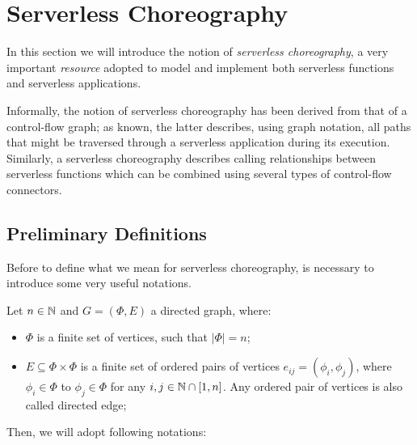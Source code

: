 \newpage
\section{Serverless Choreography}

In this section we will introduce the notion of \textit{serverless choreography}, a very important \textit{resource} adopted to model and implement both serverless functions and serverless applications.

Informally, the notion of serverless choreography has been derived from that of a control-flow graph; as known, the latter describes, using graph notation, all paths that might be traversed through a serverless application during its execution. Similarly, a serverless choreography describes calling relationships between serverless functions which can be combined using several types of control-flow connectors.

\subsection{Preliminary Definitions}

Before to define what we mean for serverless choreography, is necessary to introduce some very useful notations.

Let $n \in \mathbb{N}$ and $G = (\Phi,E)$ a directed graph, where:

\begin{itemize}
	\item $\Phi$ is a finite set of vertices, such that $|\Phi| = n$;
	\item  $E \subseteq \Phi \times \Phi $ is a finite set of ordered pairs of vertices $e_{ij} = \left( \phi_i, \phi_j \right)$, where $\phi_i \in \Phi$ to $\phi_j \in \Phi$ for any $i,j \in \mathbb{N} \cap \left[ 1, n \right]$. Any ordered pair of vertices is also called directed edge;
\end{itemize}

Then, we will adopt following notations:

